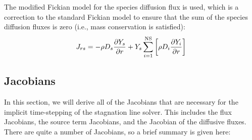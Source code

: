 \documentclass[10pt]{article}
\begin{document}
\begin{flushleft}
The modified Fickian model for the species diffusion flux is used, which is a correction to the standard Fickian model to ensure that the sum of the species diffusion fluxes is zero (i.e., mass conservation is satisfied):
\begin{equation}
    J_{rs} = -\rho D_s \frac{\partial Y_s}{\partial r} + Y_s \sum_{i=1}^\text{NS} \left[  \rho D_i \frac{\partial Y_i}{\partial r} \right]
\end{equation}

\subsection{Jacobians}

In this section, we will derive all of the Jacobians that are necessary for the implicit time-stepping of the stagnation line solver. This includes the flux Jacobians, the source term Jacobians, and the Jacobian of the diffusive fluxes. There are quite a number of Jacobians, so a brief summary is given here:


\end{flushleft}
\end{document}
